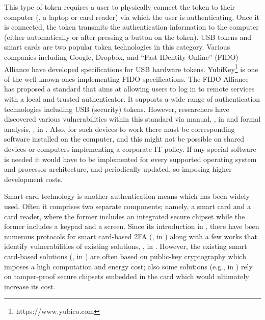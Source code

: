 This type of token requires a user to physically connect the token to their computer (\eg, a laptop or card reader) via which the user is authenticating. Once it is connected, the token transmits the authentication information to the computer (either automatically or after pressing a button on the token). USB tokens and smart cards are two popular token technologies in this category.  Various companies including Google, Dropbox, and  ``Fast IDentity Online'' (FIDO) Alliance have developed specifications for USB hardware tokens. YubiKey\footnote{https://www.yubico.com} is one of the well-known ones implementing FIDO specifications. The FIDO  Alliance has proposed a standard that aims at allowing users to log in to remote services with a local and trusted authenticator. It supports a wide range of authentication technologies including USB (security) tokens. However, researchers have discovered various vulnerabilities within this standard via manual, \eg, in \cite{PanosMNPX17,ChangMSS17,LoutfiJ15} and formal analysis, \eg, in \cite{ndss/FengLP021}. Also, for such devices to work there must be corresponding software installed on the computer, and this might not be possible on shared devices or computers implementing a corporate IT policy. If any special software is needed it would have to be implemented for every supported operating system and processor architecture, and periodically updated, so imposing higher development costs.

Smart card technology is another authentication means which has been widely used. Often it comprises two separate components; namely, a smart card and a card reader, where the former includes an integrated secure chipset while the former includes a keypad and a screen. Since its introduction in \cite{chang1991remote}, there have been numerous protocols for smart card-based 2FA (\eg, in \cite{gupta2021machine,WangW18,radhakrishnan2022dependable}) along with a few works that identify vulnerabilities of existing solutions, \eg, in \cite{TianLHL20,WangGCW16,ChaturvediDMM16}. However, the existing smart card-based solutions (\eg, in \cite{gupta2021machine,WangW18,radhakrishnan2022dependable}) are often based on public-key cryptography which imposes a high computation and energy cost; also some solutions (e.g., in \cite{kim2009more}) rely on tamper-proof secure chipsets embedded in the card which would ultimately increase its cost. 







